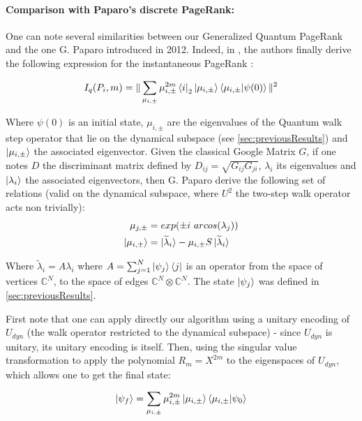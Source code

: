 \documentclass[sn-mathphys]{sn-jnl}%
\theoremstyle{thmstyleone}%
\theoremstyle{thmstyletwo}%
\theoremstyle{thmstylethree}%
\begin{document}
\paragraph{Comparison with Paparo's discrete PageRank:} One can note
several similarities between our Generalized Quantum PageRank and the
one G. Paparo introduced in 2012. Indeed, in
\cite{paparo_martin-delgado_2012}, the authors finally derive the
following expression for the instantaneous PageRank :

\begin{equation} \label{eq:instantaneous_pr}
    I_q(P_i, m) = \| \sum_{\mu_{i, \pm}} \mu_{i, \pm}^{2m} \bra{i}_2 \ket{\mu_{i, \pm}} \braket{\mu_{i, \pm} | \psi (0)} \|^2
\end{equation}

Where $\psi(0)$ is an initial state, $\mu_{i, \pm}$ are the eigenvalues of the Quantum walk step operator that lie on the dynamical subspace (see \ref{sec:previousResults}) and
$\ket{\mu_{i, \pm}}$ the associated eigenvector. Given the classical Google Matrix $G$, if one notes $D$ the discriminant matrix defined by $D_{ij} = \sqrt{G_{ij} G_{ji}}$, $\lambda_i$ its eigenvalues and $\ket{\lambda_i}$ the associated eigenvectors, then G. Paparo derive the following set of relations (valid on the dynamical subspace, where $U^2$ the two-step walk operator acts non trivially):
\begin{align}
    \mu_{j, \pm} &= exp(\pm i \ arcos(\lambda_j)) \\
    \ket{\mu_{i, \pm}} &= \ket{\widetilde{\lambda}_i} - \mu_{i, \pm} S \ket{\widetilde{\lambda}_i}
\end{align}

Where $\widetilde{\lambda}_i = A \lambda_i$ where $A = \sum_{j=1}^N \ket{\psi_j} \bra{j}$ is an operator from the space of vertices $\mathbb{C}^N$, to the space of edges $\mathbb{C}^N \otimes \mathbb{C}^N$. The state $\ket{\psi_j}$ was defined in \ref{sec:previousResults}.

First note that one can apply directly our algorithm using a unitary encoding of $U_{dyn}$ (the walk operator restricted to the dynamical subspace) - since $U_{dyn}$ is unitary, its unitary encoding is itself. Then, using the singular value transformation to apply the polynomial $R_m=X^{2m}$ to the eigenspaces of $U_{dyn}$, which allows one to get the final state:

\begin{equation}
    \ket{\psi_f} = \sum_{\mu_{i, \pm}} \mu_{i, \pm}^{2m} \ket{\mu_{i, \pm}} \braket{\mu_{i, \pm}|\psi_{0}}
\end{equation}
\end{document}
